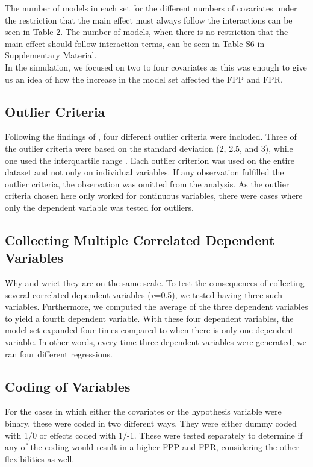 The number of models in each set for the different numbers of covariates under the restriction that the main effect must always follow the interactions can be seen in Table 2. The number of models, when there is no restriction that the main effect should follow interaction terms, can be seen in Table S6 in Supplementary Material. \\



In the simulation, we focused on two to four covariates as this was enough to give us an idea of how the increase in the model set affected the FPP and FPR. 

\subsection{Outlier Criteria}
Following the findings of \cite{Leyes2013}, four different outlier criteria were included. Three of the outlier criteria were based on the standard deviation (2, 2.5, and 3), while one used the interquartile range \citep{Rousseeuw2011}. Each outlier criterion was used on the entire dataset and not only on individual variables. If any observation fulfilled the outlier criteria, the observation was omitted from the analysis. As the outlier criteria chosen here only worked for continuous variables, there were cases where only the dependent variable was tested for outliers.

\subsection{Collecting Multiple Correlated Dependent Variables}
Why and wriet they are on the same scale. To test the consequences of collecting several correlated dependent variables (\textit{r}=0.5), we tested having three such variables. Furthermore, we computed the average of the three dependent variables to yield a fourth dependent variable. With these four dependent variables, the model set expanded four times compared to when there is only one dependent variable. In other words, every time three dependent variables were generated, we ran four different regressions. 

\subsection{Coding of Variables}
For the cases in which either the covariates or the hypothesis variable were binary, these were coded in two different ways. They were either dummy coded with 1/0 or effects coded with 1/-1. These were tested separately to determine if any of the coding would result in a higher FPP and FPR, considering the other flexibilities as well. 

